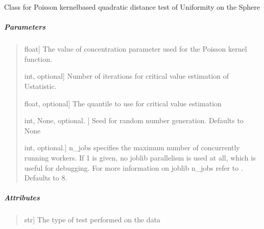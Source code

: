 \documentclass[letterpaper,10pt,english,openany,oneside]{sphinxmanual}
\begin{document}
\begin{fulllineitems}
\label{\detokenize{api_reference/generated/QuadratiK.poisson_kernel_test.PoissonKernelTest:QuadratiK.poisson_kernel_test.PoissonKernelTest}}
\pysigstartsignatures
{}
\pysigstopsignatures
\sphinxAtStartPar
Class for Poisson kernel\sphinxhyphen{}based quadratic distance 
test of Uniformity on the Sphere


\subparagraph{Parameters}
\label{\detokenize{api_reference/generated/QuadratiK.poisson_kernel_test.PoissonKernelTest:parameters}}\begin{quote}
\begin{description}
\sphinxlineitem{rho}{[}float{]}
\sphinxAtStartPar
The value of concentration parameter used for the 
Poisson kernel function.

\sphinxlineitem{num\_iter}{[}int, optional{]}
\sphinxAtStartPar
Number of iterations for critical value estimation of U\sphinxhyphen{}statistic.

\sphinxlineitem{quantile}{[}float, optional{]}
\sphinxAtStartPar
The quantile to use for critical value estimation

\sphinxlineitem{random\_state}{[}int, None, optional. {]}
\sphinxAtStartPar
Seed for random number generation. Defaults to None

\sphinxlineitem{n\_jobs}{[}int, optional.{]}
\sphinxAtStartPar
n\_jobs specifies the maximum number of concurrently running workers. 
If 1 is given, no joblib parallelism is used at all, which is useful for debugging.
For more information on joblib n\_jobs refer 
to \sphinxhyphen{} . 
Defaults to 8.

\end{description}
\end{quote}


\subparagraph{Attributes}
\label{\detokenize{api_reference/generated/QuadratiK.poisson_kernel_test.PoissonKernelTest:attributes}}\begin{quote}
\begin{description}
\sphinxlineitem{test\_type\_}{[}str{]}
\sphinxAtStartPar
The type of test performed on the data


\end{description}
\end{quote}
\end{fulllineitems}
\end{document}
